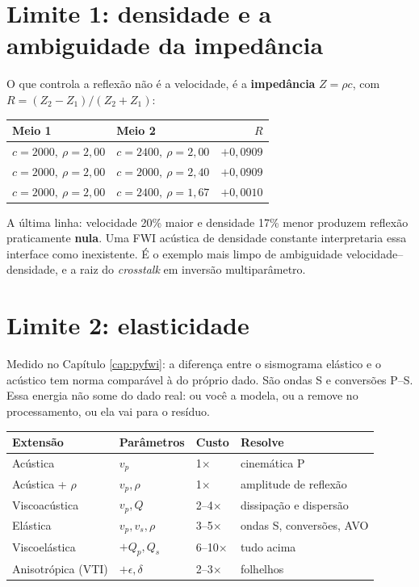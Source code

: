 \documentclass[11pt,a4paper,oneside]{report}
\begin{document}
\section{Limite 1: densidade e a ambiguidade da impedância}

O que controla a reflexão não é a velocidade, é a \textbf{impedância}
$Z = \rho c$, com $R = (Z_2-Z_1)/(Z_2+Z_1)$:

\begin{center}
\begin{tabular}{@{}llr@{}}
\toprule
\textbf{Meio 1} & \textbf{Meio 2} & $R$ \\
\midrule
$c=2000,\ \rho=2{,}00$ & $c=2400,\ \rho=2{,}00$ & $+0{,}0909$ \\
$c=2000,\ \rho=2{,}00$ & $c=2000,\ \rho=2{,}40$ & $+0{,}0909$ \\
$c=2000,\ \rho=2{,}00$ & $c=2400,\ \rho=1{,}67$ & $+0{,}0010$ \\
\bottomrule
\end{tabular}
\end{center}

A última linha: velocidade 20\% maior e densidade 17\% menor produzem reflexão
praticamente \textbf{nula}. Uma FWI acústica de densidade constante
interpretaria essa interface como inexistente. É o exemplo mais limpo de
ambiguidade velocidade--densidade, e a raiz do \emph{crosstalk} em inversão
multiparâmetro.

\section{Limite 2: elasticidade}

Medido no Capítulo \ref{cap:pyfwi}: a diferença entre o sismograma elástico e
o acústico tem norma comparável à do próprio dado. São ondas S e conversões
P--S. Essa energia não some do dado real: ou você a modela, ou a remove no
processamento, ou ela vai para o resíduo.

\begin{center}
\begin{tabular}{@{}llll@{}}
\toprule
\textbf{Extensão} & \textbf{Parâmetros} & \textbf{Custo} & \textbf{Resolve} \\
\midrule
Acústica & $v_p$ & 1$\times$ & cinemática P \\
Acústica + $\rho$ & $v_p,\rho$ & 1$\times$ & amplitude de reflexão \\
Viscoacústica & $v_p,Q$ & 2--4$\times$ & dissipação e dispersão \\
Elástica & $v_p,v_s,\rho$ & 3--5$\times$ & ondas S, conversões, AVO \\
Viscoelástica & $+Q_p,Q_s$ & 6--10$\times$ & tudo acima \\
Anisotrópica (VTI) & $+\epsilon,\delta$ & 2--3$\times$ & folhelhos \\
\bottomrule
\end{tabular}
\end{center}
\end{document}

